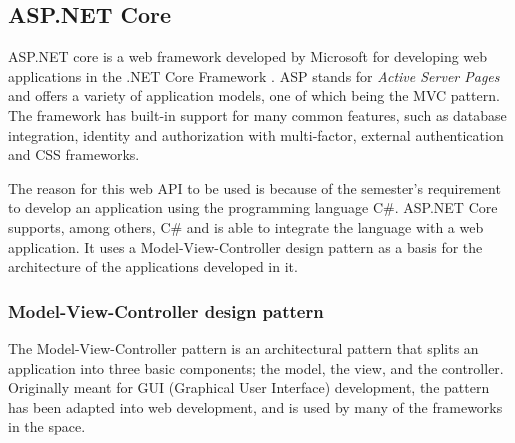 \subsection{ASP.NET Core} \label{sec:aspnetcore}

ASP.NET core is a web framework developed by Microsoft for developing web applications in the .NET Core Framework \cite{aspnetcore2}.
ASP stands for \textit{Active Server Pages} and offers a variety of application models, one of which being the MVC pattern.
The framework has built-in support for many common features, such as database integration, identity and authorization with multi-factor, external authentication and CSS frameworks.

The reason for this web API to be used is because of the semester's requirement to develop an application using the programming language C\#.
ASP.NET Core supports, among others, C\# and is able to integrate the language with a web application.
It uses a Model-View-Controller design pattern as a basis for the architecture of the applications developed in it.


\subsubsection{Model-View-Controller design pattern}
The Model-View-Controller pattern is an architectural pattern that splits an application into three basic components; the model, the view, and the controller.
Originally meant for GUI (Graphical User Interface) development, the pattern has been adapted into web development, and is used by many of the frameworks in the space. \cite{gangoffour}

